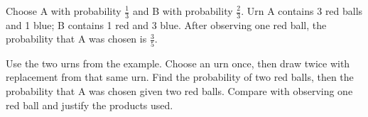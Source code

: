 \documentclass[11pt]{article}
\begin{document}
Choose A with probability \(\frac{1}{3}\) and B with probability \(\frac{2}{3}\). Urn A contains 3 red balls and 1 blue; B contains 1 red and 3 blue. After observing one red ball, the probability that A was chosen is \(\frac{3}{5}\).\par
\vspace{5pt}
Use the two urns from the example. Choose an urn once, then draw twice with replacement from that same urn. Find the probability of two red balls, then the probability that A was chosen given two red balls. Compare with observing one red ball and justify the products used.\par
\vspace{5pt}
\end{document}
